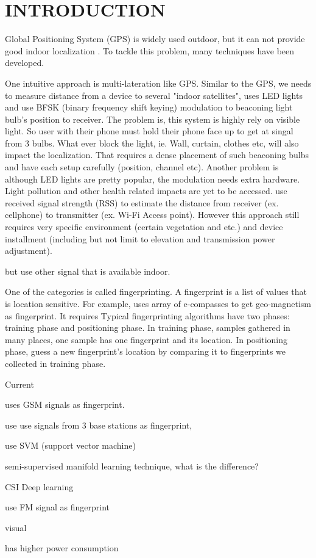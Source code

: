 \chapter{INTRODUCTION}

Global Positioning System (GPS) is widely used outdoor, but it can not provide good indoor localization \cite{pulkkinen2011semi, varshavsky2007gsm}. To tackle this problem, many techniques have been developed. 

One intuitive approach is multi-lateration like GPS. Similar to the GPS, we needs to measure distance from a device to several "indoor satellites", \cite{hu2013pharos} uses LED lights and use BFSK (binary frequency shift keying) modulation to beaconing light bulb's position to receiver. The problem is, this system is highly rely on visible light. So user with their phone must hold their phone face up to get at singal from 3 bulbs. What ever block the light, ie. Wall, curtain, clothes etc, will also impact the localization. That requires a dense placement of such beaconing bulbs and have each setup carefully (position, channel etc). Another problem is although LED lights are pretty popular, the modulation needs extra hardware. Light pollution and other health related impacts are yet to be accessed.  \cite{whitehouse2007practical} use received signal strength (RSS) to estimate the distance from receiver (ex. cellphone) to transmitter (ex. Wi-Fi Access point). However this approach still requires very specific environment (certain vegetation and etc.) and device installment (including but not limit to elevation and transmission power adjustment). 

but use other signal that is available indoor.

 
One of the categories is called fingerprinting. A fingerprint is a list of values that is location sensitive. For example, \cite{chung2011indoor} uses array of e-compasses to get geo-magnetism as fingerprint. It requires  Typical fingerprinting algorithms have two phases: training phase and positioning phase. In training phase, samples gathered in many places, one sample has one fingerprint and its location. In positioning phase, guess a new fingerprint's location by comparing it to fingerprints we collected in training phase. 

Current 


\cite{varshavsky2007gsm} uses GSM signals as fingerprint. 

\cite{bahl2000radar} use use signals from 3 base stations as fingerprint,

\cite{brunato2005statistical} use SVM (support vector machine)

\cite{pulkkinen2011semi}semi-supervised manifold learning technique, what is the difference? 

CSI Deep learning

\cite{chen2012fm} use FM signal as fingerprint

visual

has higher power consumption